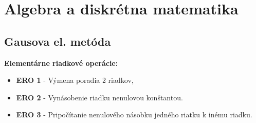 \section{Algebra a diskrétna matematika}

\subsection{Gausova el. metóda}
\textbf{Elementárne riadkové operácie:}
\begin{itemize}
  \item \textbf{ERO 1} - Výmena poradia 2 riadkov,
  \item \textbf{ERO 2} - Vynásobenie riadku nenulovou konštantou.
  \item \textbf{ERO 3} - Pripočítanie nenulového násobku jedného riatku k inému riadku.
\end{itemize}